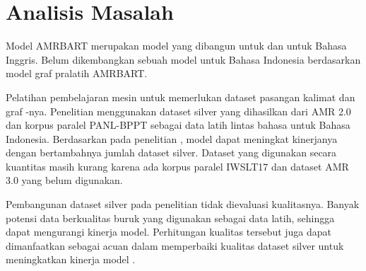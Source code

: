 \section{Analisis Masalah}

Model \gls{AMRBART}  merupakan model \sota{} yang dibangun untuk \amrparsing{} dan \AMRtoTEXT{} untuk Bahasa Inggris.
Belum dikembangkan sebuah model \amrparsing{} \crosslingual{} untuk Bahasa Indonesia berdasarkan model graf pralatih \gls{AMRBART}.

Pelatihan pembelajaran mesin untuk  \amrparsing{} memerlukan dataset  pasangan kalimat dan graf \AMR{}-nya.
Penelitian \textcite{putra2022} menggunakan dataset silver yang dihasilkan dari AMR 2.0 dan korpus paralel PANL-BPPT sebagai data latih \amrparsing{} lintas bahasa untuk Bahasa Indonesia.
Berdasarkan pada penelitian \textcite{lee2022}, model \amrparsing{} dapat meningkat kinerjanya dengan bertambahnya jumlah dataset silver.
Dataset yang digunakan \textcite{putra2022} secara kuantitas masih kurang karena ada korpus paralel IWSLT17 dan dataset AMR 3.0 yang belum digunakan.

Pembangunan dataset silver pada penelitian \textcite{putra2022} tidak dievaluasi kualitasnya.
Banyak potensi  data berkualitas buruk yang digunakan sebagai data latih, sehingga dapat mengurangi kinerja model.
Perhitungan kualitas tersebut juga dapat dimanfaatkan sebagai acuan dalam memperbaiki kualitas dataset silver untuk meningkatkan kinerja model \amrparsing{}.
